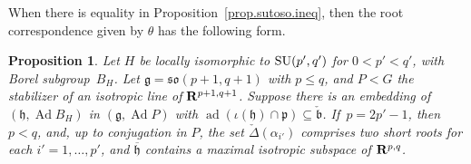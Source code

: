 \documentclass[pdftex]{sigma}
\numberwithin{equation}{section}
\newtheorem{prop}[thm]{Proposition}
\theoremstyle{definition}
\newcommand{\BR}{{\bf R}}
\newcommand{\lieg}{\mathfrak{g}}
\newcommand{\lieh}{\mathfrak{h}}
\def\p{{\mathfrak p}}
\def\b{{\mathfrak b}}
\newcommand{\so}{\mathfrak{so}}
\newcommand{\SU}{{\rm SU}}
\begin{document}
When there is equality in Proposition~\ref{prop.sutoso.ineq}, then the root correspondence given by $\theta$ has the following form.

\begin{prop}
\label{prop.sutoso.roots}
Let $H$ be locally isomorphic to $\SU(p',q')$ for $0 < p' < q'$, with Borel subgroup~$B_H$. Let $\lieg = \so(p+1,q+1)$ with $p \leq q$, and $P < G$ the stabilizer of an isotropic line of $\BR^{p+1,q+1}$. Suppose there is an embedding of $(\lieh, \operatorname{Ad} B_H)$ in $(\lieg, \operatorname{Ad}P)$ with $\operatorname{ad}(\iota(\lieh) \cap \p ) \subseteq \check{\b}$.
If~${p=2p'-1}$, then $p<q$, and, up to conjugation in $P$, the set $\check{\Delta}(\alpha_{i'})$ comprises two short roots for each $i'=1, \dots, p'$, and $\overline{\lieh}$ contains a maximal isotropic subspace of $\BR^{p,q}$.
\end{prop}
\end{document}
